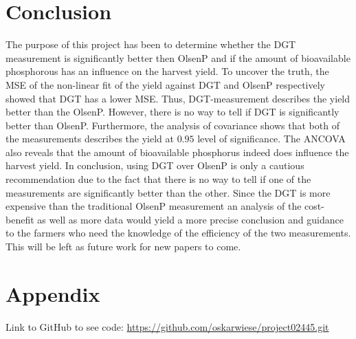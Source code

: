 \documentclass[11pt, fleqn, titlepage]{article}
\begin{document}
\section{Conclusion}

The purpose of this project has been to determine whether the DGT measurement is significantly better then OlsenP and if the amount of bioavailable phosphorous has an influence on the harvest yield. To uncover the truth, the MSE of the non-linear fit of the yield against DGT and OlsenP respectively showed that DGT has a lower MSE. Thus, DGT-measurement describes the yield better than the OlsenP. However, there is no way to tell if DGT is significantly better than OlsenP. Furthermore, the analysis of covariance shows that both of the measurements describes the yield at $ 0.95 $ level of significance. The ANCOVA also reveals that the amount of bioavailable phosphorus indeed does influence the harvest yield. In conclusion, using DGT over OlsenP is only a cautious recommendation due to the fact that there is no way to tell if one of the measurements are significantly better than the other. Since the DGT is more expensive than the traditional OlsenP measurement an analysis of the cost-benefit as well as more data would yield a more precise conclusion and guidance to the farmers who need the knowledge of the efficiency of the two measurements. This will be left as future work for new papers to come.

\newpage

\section{Appendix}

Link to GitHub to see code:
\url{https://github.com/oskarwiese/project02445.git}



\end{document}
